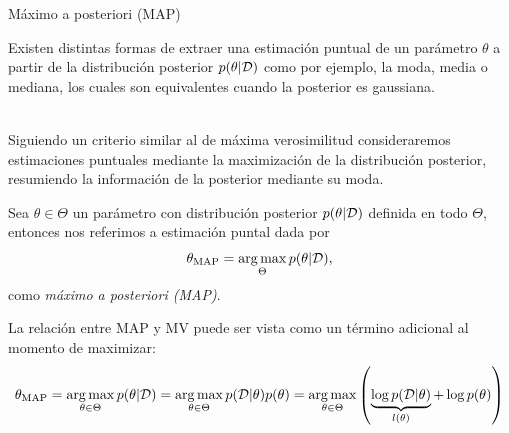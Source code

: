 \documentclass[9pt, handout]{beamer}
\begin{document}
\begin{frame}{Máximo a posteriori (MAP)}

Existen distintas formas de extraer una estimación puntual de un parámetro $\theta$ a partir de la distribución posterior $p(\theta|{\mathcal D})$ como por ejemplo, la moda, media o mediana, los cuales son equivalentes cuando la posterior es gaussiana.\\~\ \pause

Siguiendo un criterio similar al de máxima verosimilitud consideraremos estimaciones puntuales mediante la maximización de la distribución posterior, resumiendo la información de la posterior mediante su moda. 

\begin{definition}
Sea $\theta\in\Theta$ un parámetro con distribución posterior $p(\theta|{\mathcal D})$ definida en todo $\Theta$, entonces nos referimos a estimación puntal dada por
\begin{equation*}
	\theta_\text{MAP} = \operatorname*{arg\,max}_{\Theta}p(\theta|{\mathcal D}),
\end{equation*}
como \emph{máximo a posteriori (MAP)}.

\end{definition}\pause

La relación entre MAP y MV puede ser vista como un término adicional al momento de maximizar:
\begin{equation*}
	\theta_\text{MAP} = \operatorname*{arg\,max}_{\theta\in\Theta}p(\theta|{\mathcal D}) = \operatorname*{arg\,max}_{\theta\in\Theta}p({\mathcal D}|\theta)p(\theta)= \operatorname*{arg\,max}_{\theta\in\Theta}\left(\underbrace{\log p({\mathcal D}|\theta)}_{l(\theta)} + \log p(\theta)\right)
\end{equation*}
	
\end{frame}
\end{document}

